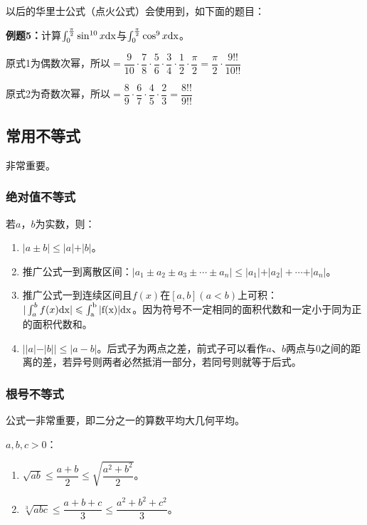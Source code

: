 \documentclass[UTF8, 12pt]{ctexart}
\begin{document}
以后的华里士公式（点火公式）会使用到，如下面的题目：

\textbf{例题5：}计算$\int_0^{\frac{\pi}{2}}\sin^{10}x\rm{d}x$与$\int_0^{\frac{\pi}{2}}\cos^9x\rm{d}x$。

原式1为偶数次幂，所以$=\dfrac{9}{10}\cdot\dfrac{7}{8}\cdot\dfrac{5}{6}\cdot\dfrac{3}{4}\cdot\dfrac{1}{2}\cdot\dfrac{\pi}{2}=\dfrac{\pi}{2}\cdot\dfrac{9!!}{10!!}$

原式2为奇数次幂，所以$=\dfrac{8}{9}\cdot\dfrac{6}{7}\cdot\dfrac{4}{5}\cdot\dfrac{2}{3}=\dfrac{8!!}{9!!}$

\subsection{常用不等式}

非常重要。

\subsubsection{绝对值不等式}

若$a$，$b$为实数，则：

\begin{enumerate}
    \item $\vert a\pm b\vert\leqslant\vert a\vert+\vert b\vert$。
    \item 推广公式一到离散区间：$\vert a_1\pm a_2\pm a_3\pm\cdots\pm a_n\vert\leqslant\vert a_1\vert+\vert a_2\vert+\cdots+\vert a_n\vert$。
    \item 推广公式一到连续区间且$f(x)$在$[a,b](a<b)$上可积：$\vert\int_a^bf(x)\rm{d}x\vert\leqslant\int_a^b\vert f(x)\vert\rm{d}x$。因为符号不一定相同的面积代数和一定小于同为正的面积代数和。
    \item $\vert\vert a\vert-\vert b\vert\vert\leqslant\vert a-b\vert$。后式子为两点之差，前式子可以看作$a$、$b$两点与0之间的距离的差，若异号则两者必然抵消一部分，若同号则就等于后式。
\end{enumerate}



\subsubsection{根号不等式}

公式一非常重要，即二分之一的算数平均大几何平均。

$a,b,c>0$：

\begin{enumerate}
    \item $\sqrt{ab}\leqslant\dfrac{a+b}{2}\leqslant\sqrt{\dfrac{a^2+b^2}{2}}$。
    \item $\sqrt[3]{abc}\leqslant\dfrac{a+b+c}{3}\leqslant\dfrac{a^2+b^2+c^2}{3}$。
\end{enumerate}
\end{document}
